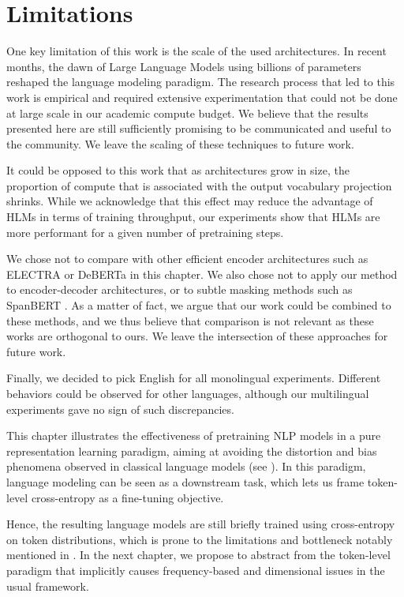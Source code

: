 

\section{Limitations}
One key limitation of this work is the scale of the used architectures. In recent months, the dawn of Large Language Models using billions of parameters reshaped the language modeling paradigm. The research process that led to this work is empirical and required extensive experimentation that could not be done at large scale in our academic compute budget. We believe that the results presented here are still sufficiently promising to be communicated and useful to the community. We leave the scaling of these techniques to future work.

It could be opposed to this work that as architectures grow in size, the proportion of compute that is associated with the output vocabulary projection shrinks. While we acknowledge that this effect may reduce the advantage of HLMs in terms of training throughput, our experiments show that HLMs are more performant for a given number of pretraining steps.

We chose not to compare with other efficient encoder architectures such as ELECTRA or DeBERTa in this chapter. We also chose not to apply our method to encoder-decoder architectures, or to subtle masking methods such as SpanBERT \citep{joshi-etal-2020-spanbert}. As a matter of fact, we argue that our work could be combined to these methods, and we thus believe that comparison is not relevant as these works are orthogonal to ours. We leave the intersection of these approaches for future work.

Finally, we decided to pick English for all monolingual experiments. Different behaviors could be observed for other languages, although our multilingual experiments gave no sign of such discrepancies.

\vspace{2em}

This chapter illustrates the effectiveness of pretraining NLP models in a pure representation learning paradigm, aiming at avoiding the distortion and bias phenomena observed in classical language models (see ). In this paradigm, language modeling can be seen as a downstream task, which lets us frame token-level cross-entropy as a fine-tuning objective.

Hence, the resulting language models are still briefly trained using cross-entropy on token distributions, which is prone to the limitations and bottleneck notably mentioned in . In the next chapter, we propose to abstract from the token-level paradigm that implicitly causes frequency-based and dimensional issues in the usual framework.